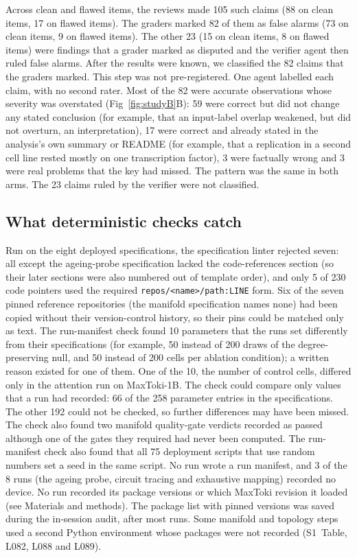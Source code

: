 \documentclass[10pt,letterpaper]{article}
\begin{document}
Across clean and flawed items, the reviews made 105 such claims (88 on
clean items, 17 on flawed items). The graders marked 82 of them as false
alarms (73 on clean items, 9 on flawed items). The other 23 (15 on clean
items, 8 on flawed items) were findings that a grader marked as disputed
and the verifier agent then ruled false alarms. After the results were
known, we classified the 82 claims that the graders marked. This step was
not pre-registered. One agent labelled each claim, with no second rater.
Most of the 82 were accurate observations whose severity was overstated
(Fig~\ref{fig:studyB}B): 59 were correct but did not change any stated
conclusion (for example, that an input-label overlap weakened, but did
not overturn, an interpretation), 17 were correct and already stated in
the analysis's own summary or README (for example, that a replication in
a second cell line rested mostly on one transcription factor), 3 were
factually wrong and 3 were real problems that the key had missed. The
pattern was the same in both arms. The 23 claims ruled by the verifier
were not classified.

\subsection*{What deterministic checks catch}
Run on the eight deployed specifications, the specification linter
rejected seven: all except the ageing-probe specification lacked the
code-references section (so their later sections were also numbered out
of template order), and only 5 of 230 code pointers used the required
\texttt{repos/<name>/path:LINE} form. Six of the seven pinned reference
repositories (the manifold specification names none) had been copied
without their version-control history, so their pins could be matched
only as text. The run-manifest check found 10 parameters that the runs
set differently from their specifications (for example, 50 instead of
200 draws of the degree-preserving null, and 50 instead of 200 cells per
ablation condition); a written reason existed for one of them. One of
the 10, the number of control cells, differed only in the attention run
on MaxToki-1B. The check could compare only values that a run had
recorded: 66 of the 258 parameter entries in the specifications. The
other 192 could not be checked, so further differences may have been
missed. The check also found two manifold quality-gate verdicts recorded
as passed although one of the gates they required had never been
computed. The run-manifest check also found that all 75 deployment
scripts that use random numbers set a seed in the same script. No run
wrote a run manifest, and 3 of the 8 runs (the ageing probe, circuit
tracing and exhaustive mapping) recorded no device. No run recorded its
package versions or which MaxToki revision it loaded (see Materials and
methods). The package list with pinned versions was saved during the
in-session audit, after most runs. Some manifold and topology steps used
a second Python environment whose packages were not recorded (S1~Table,
L082, L088 and L089).
\end{document}
